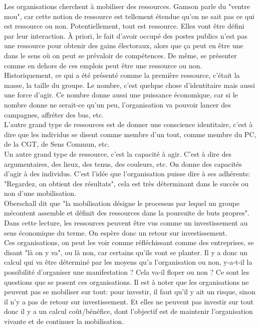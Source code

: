 \documentclass[10pt, a4paper, openany]{book}
\begin{document}
Les organisations cherchent à mobiliser des ressources. Gamson parle du "ventre mou", car cette notion de ressource est tellement étendue qu'on ne sait pas ce qui est ressource ou non. Potentiellement, tout est ressource. Elles vont être défini par leur interaction. À priori, le fait d'avoir occupé des postes publics n'est pas une ressource pour obtenir des gains électoraux, alors que ça peut en être une dans le sens où on peut se prévaloir de compétences. De même, se présenter comme en dehors de ces emplois peut être une ressource ou non. \\
Historiquement, ce qui a été présenté comme la première ressource, c'était la masse, la taille du groupe. Le nombre, c'est quelque chose d'identitaire mais aussi une force d'agir. Ce nombre donne aussi une puissance économique, car si le nombre donne ne serait-ce qu'un peu, l'organisation va pouvoir lancer des campagnes, affréter des bus, etc. \\
L'autre grand type de ressources est de donner une conscience identitaire, c'est à dire que les individus se disent comme membre d'un tout, comme membre du PC, de la CGT, de Sens Commun, etc. \\
Un autre grand type de ressource, c'est la capacité à agir. C'est à dire des argumentaires, des lieux, des tenus, des couleurs, etc. On donne des capacités d'agir à des individus. C'est l'idée que l'organisation puisse dire à ses adhérents: "Regardez, on obtient des résultats", cela est très déterminant dans le succès ou non d'une mobilisation. \\
Oberschall dit que "la mobilisation désigne le processus par lequel un groupe mécontent assemble et définit des ressources dans la poursuite de buts propres". Dans cette lecture, les ressources peuvent être vus comme un investissement au sens économique du terme. On espère donc un retour sur investissement. \\
Ces organisations, on peut les voir comme réfléchissant comme des entreprises, se disant "là on y va", ou là non, car certains qu'ils vont se planter. Il y a donc un calcul qui va être déterminé par les moyens qu'a l'organisation ou non, y-a-t-il la possibilité d'organiser une manifestation ? Cela va-il floper ou non ? Ce sont les questions que se posent ces organisations. Il est à noter que les organisations ne peuvent pas se mobiliser sur tout: pour investir, il faut qu'il y ait un risque, sinon il n'y a pas de retour sur investissement. Et elles ne peuvent pas investir sur tout donc il y a un calcul coût/bénéfice, dont l'objectif est de maintenir l'organisation vivante et de continuer la mobilisation. \\
\end{document}
